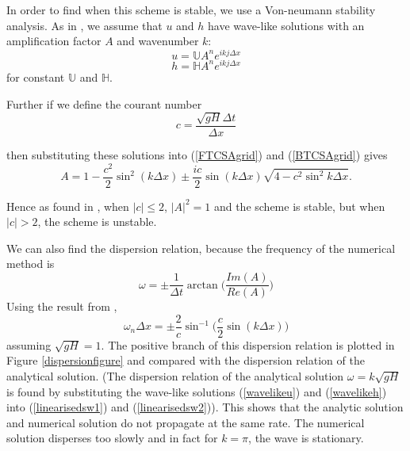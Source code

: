 \documentclass[a4paper,12pt, notitlepage]{article}
\begin{document}
In order to find when this scheme is stable, we use a Von-neumann stability analysis. As in \cite{MPE textbook}, we assume that $u$ and $h$ have wave-like solutions with an amplification factor $A$ and wavenumber $k$:
\begin{equation} \label{wavelikeu}
u  =  \mathbb{U}  A^{n} e^{ikj\Delta x}
\end{equation}
\begin{equation} \label{wavelikeh}
h  =  \mathbb{H} A^{n} e^{ikj\Delta x}
\end{equation}
for constant $\mathbb{U}$ and $\mathbb{H}$.

Further if we define the courant number 
\begin{equation}\label{courantnumber}
c = \frac{\sqrt{gH}\Delta t}{\Delta x}
\end{equation}

then substituting these solutions into (\ref{FTCSAgrid}) and (\ref{BTCSAgrid}) gives
\begin{equation}
A = 1 - \frac{c^{2}}{2} \sin^{2}(k\Delta x) \pm \frac{ic}{2}\sin(k\Delta x)\sqrt{4 - c^{2}\sin^{2}k\Delta x}.
\end{equation} 
 
Hence as found in \cite{MPE textbook}, when $\lvert c \rvert \leq 2$, $\lvert A \rvert^{2} = 1$ and the scheme is stable, but when $\lvert c \rvert > 2$, the scheme is unstable.
 
We can also find the dispersion relation, because the frequency of the numerical method is 
\begin{equation} \label{frequency}
\omega = \pm \frac{1}{\Delta t} \arctan\bigg(\frac{Im(A)}{Re(A)}\bigg)
\end{equation}
Using the result from \cite{MPE textbook}, 
\begin{equation}
\omega_{n}\Delta x = \pm \frac{2}{c} \sin^{-1} \bigg(\frac{c}{2}\sin(k\Delta x)\bigg)
\end{equation}
assuming $\sqrt{gH} = 1$. The positive branch of this dispersion relation is plotted in Figure \ref{dispersionfigure} and compared with the dispersion relation of the analytical solution. (The dispersion relation of the analytical solution $\omega = k\sqrt{gH}$ is found by substituting the wave-like solutions (\ref{wavelikeu}) and (\ref{wavelikeh}) into (\ref{linearisedsw1}) and (\ref{linearisedsw2})). This shows that the analytic solution and numerical solution do not propagate at the same rate. The numerical solution disperses too slowly and in fact for $k = \pi$, the wave is stationary.
\end{document}
